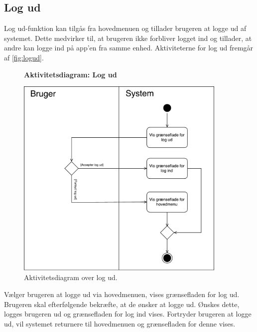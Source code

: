 \subsection*{Log ud}
Log ud-funktion kan tilgås fra hovedmenuen og tillader brugeren at logge ud af systemet. Dette medvirker til, at brugeren ikke forbliver logget ind og tillader, at andre kan logge ind på app'en fra samme enhed.
Aktiviteterne for log ud fremgår af \autoref{fig:logud}.

\begin{figure} [H]
\centering
\textbf{Aktivitetsdiagram: Log ud}\par\medskip
\includegraphics[width=0.9\textwidth]{figures/aktivitetsdiagram/Logud}
\caption{Aktivitetsdiagram over log ud.}
\label{fig:logud}
\end{figure}

\noindent
Vælger brugeren at logge ud via hovedmenuen, vises grænsefladen for log ud. Brugeren skal efterfølgende bekræfte, at de ønsker at logge ud. Ønskes dette, logges brugeren ud og grænsefladen for log ind vises. Fortryder brugeren at logge ud, vil systemet returnere til hovedmenuen og grænsefladen for denne vises. 